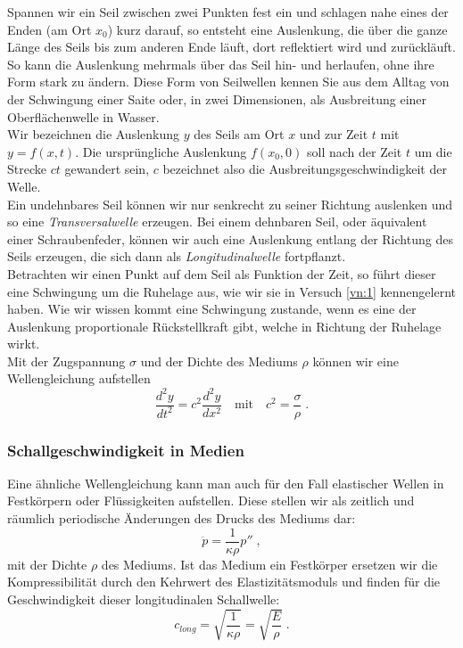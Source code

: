 Spannen wir ein Seil zwischen zwei Punkten fest ein und schlagen nahe eines der Enden (am Ort $x_0$) kurz darauf, so entsteht eine Auslenkung, die über die ganze Länge des Seils bis zum anderen Ende läuft, dort reflektiert wird und zurückläuft. So kann die Auslenkung mehrmals über das Seil hin- und herlaufen, ohne ihre Form stark zu ändern. Diese Form von Seilwellen kennen Sie aus dem Alltag von der Schwingung einer Saite oder, in zwei Dimensionen, als Ausbreitung einer Oberflächenwelle in Wasser.\\
Wir bezeichnen die Auslenkung $y$ des Seils am Ort $x$ und zur Zeit $t$ mit $y=f(x,t)$. Die ursprüngliche Auslenkung $f(x_0, 0)$ soll nach der Zeit $t$ um die Strecke $ct$ gewandert sein, $c$ bezeichnet also die Ausbreitungsgeschwindigkeit der Welle.\\
Ein undehnbares Seil können wir nur senkrecht zu seiner Richtung auslenken und so eine \textit{Transversalwelle} erzeugen. Bei einem dehnbaren Seil, oder äquivalent einer Schraubenfeder, können wir auch eine Auslenkung entlang der Richtung des Seils erzeugen, die sich dann als \textit{Longitudinalwelle} fortpflanzt.\\

\noindent
Betrachten wir einen Punkt auf dem Seil als Funktion der Zeit, so führt dieser eine Schwingung um die Ruhelage aus, wie wir sie in Versuch \ref{vn:1} kennengelernt haben. Wie wir wissen kommt eine Schwingung zustande, wenn es eine der Auslenkung proportionale Rückstellkraft gibt, welche in Richtung der Ruhelage wirkt.\\
Mit der Zugspannung $\sigma$ und der Dichte des Mediums $\rho$ können wir eine Wellengleichung aufstellen
\begin{equation*}
	\frac{d^2 y}{dt^2} = c^2\frac{d^2 y}{dx^2}\quad \mathrm{mit}\quad c^2 = \frac{\sigma}{\rho}\; .
\end{equation*}

\subsubsection{Schallgeschwindigkeit in Medien}

Eine ähnliche Wellengleichung kann man auch für den Fall elastischer Wellen in Festkörpern oder Flüssigkeiten aufstellen. Diese stellen wir als zeitlich und räumlich periodische Änderungen des Drucks des Mediums dar:
\begin{equation*}
	\ddot{p} = \frac{1}{\kappa\rho} p''\; ,
\end{equation*}
mit der Dichte $\rho$ des Mediums. Ist das Medium ein Festkörper ersetzen wir die Kompressibilität durch den Kehrwert des Elastizitätsmoduls und finden für die Geschwindigkeit dieser longitudinalen Schallwelle:
\begin{equation}
	c_{long} = \sqrt{\frac{1}{\kappa\rho}} = \sqrt{\frac{E}{\rho}}\; .
\end{equation}

